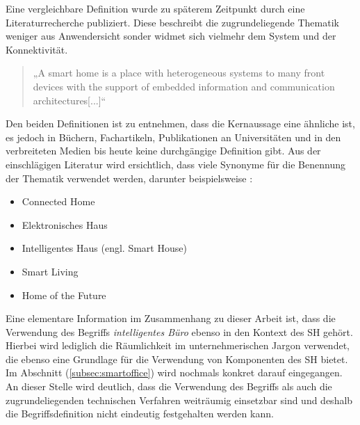     Eine vergleichbare Definition wurde zu späterem Zeitpunkt durch eine Literaturrecherche publiziert. Diese beschreibt 
    die zugrundeliegende Thematik weniger aus Anwendersicht sonder widmet sich vielmehr dem System und der Konnektivität. 
    \begin{quote}
        „A smart home is a place with heterogeneous systems to many
        front devices with the support of embedded information and
        communication architectures[...]“ \cite{Balakrishnan2018}
    \end{quote}
    Den beiden Definitionen ist zu entnehmen, dass die Kernaussage eine ähnliche ist, es jedoch in Büchern, Fachartikeln, 
    Publikationen an Universitäten und in den verbreiteten Medien bis heute keine durchgängige Definition gibt. Aus der
    einschlägigen Literatur wird ersichtlich, dass viele Synonyme für die Benennung der Thematik verwendet werden, darunter 
    beispielsweise \cite{strese.2010m}:
    \\
    \linebreak
    \begin{itemize}
        \item Connected Home
        \item Elektronisches Haus
        \item Intelligentes Haus (engl. Smart House)
        \item Smart Living
        \item Home of the Future 
    \end{itemize}
    Eine elementare Information im Zusammenhang zu dieser Arbeit ist, dass die Verwendung des Begriffs \textit{intelligentes Büro} 
    ebenso in den Kontext des \acl{SH} gehört. Hierbei wird lediglich die Räumlichkeit im unternehmerischen Jargon verwendet, 
    die ebenso eine Grundlage für die Verwendung von Komponenten des \acl{SH} bietet. Im Abschnitt (\ref{subsec:smartoffice}) wird 
    nochmals konkret darauf eingegangen.
    \\
    An dieser Stelle wird deutlich, dass die Verwendung des Begriffs als auch die zugrundeliegenden technischen Verfahren 
    weiträumig einsetzbar sind und deshalb die Begriffsdefinition nicht eindeutig festgehalten werden kann. 
    
